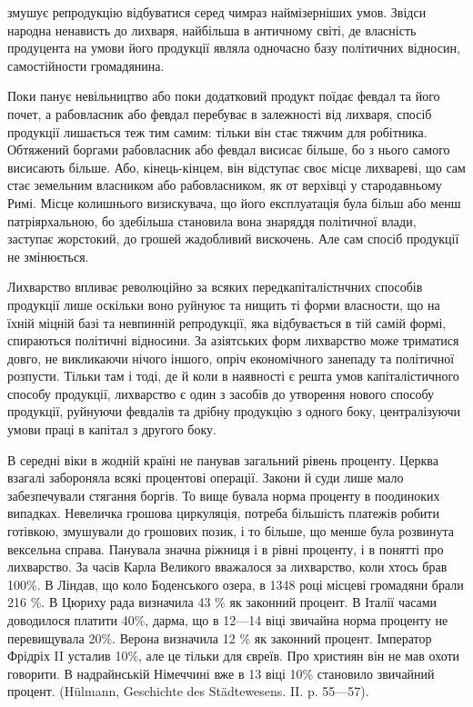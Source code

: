 \parcont{}  %
змушує репродукцію відбуватися серед чимраз наймізерніших умов. Звідси народна
ненависть до лихваря, найбільша в античному світі, де власність продуцента на
умови його продукції являла одночасно базу політичних відносин, самостійности
громадянина.

Поки панує невільництво або поки додатковий продукт поїдає февдал та
його почет, а рабовласник або февдал перебуває в залежності від лихваря,
спосіб продукції лишається теж тим самим: тільки він стає тяжчим для робітника.
Обтяжений боргами рабовласник або февдал висисає більше, бо з нього
самого висисають більше. Або, кінець-кінцем, він відступає своє місце лихвареві,
що сам стає земельним власником або рабовласником, як от верхівці
у стародавньому Римі. Місце колишнього визискувача, що його експлуатація
була більш або менш патріярхальною, бо здебільша становила вона знаряддя
політичної влади, заступає жорстокий, до грошей жадобливий вискочень. Але сам
спосіб продукції не змінюється.

Лихварство впливає революційно за всяких передкапіталістнчних способів
продукції лише оскільки воно руйнуює та нищить ті форми власности, що
на їхній міцній базі та невпинній репродукції, яка відбувається в тій самій
формі, спираються політичні відносини. За азіятських форм лихварство може
триматися довго, не викликаючи нічого іншого, опріч економічного занепаду та
політичної розпусти. Тільки там і тоді, де й коли в наявності є решта умов капіталістичного
способу продукції, лихварство є один з засобів до утворення
нового способу продукції, руйнуючи февдалів та дрібну продукцію з одного боку,
централізуючи умови праці в капітал з другого боку.

В середні віки в жодній країні не панував загальний рівень проценту.
Церква взагалі забороняла всякі процентові операції. Закони й суди лише мало
забезпечували стягання боргів. То вище бувала норма проценту в поодиноких
випадках. Невеличка грошова циркуляція, потреба більшість платежів робити
готівкою, змушували до грошових позик, і то більше, що менше була розвинута
вексельна справа. Панувала значна ріжниця і в рівні проценту, і в понятті про
лихварство. За часів Карла Великого вважалося за лихварство, коли хтось брав
100\%. В Ліндав, що коло Боденського озера, в 1348 році місцеві громадяни брали
216 \%. В Цюриху рада визначила 43 \% як законний процент. В Італії часами
доводилося платити 40\%, дарма, що в 12—14 віці звичайна норма проценту
не перевищувала 20\%. Верона визначила 12 \% як законний процент. Імператор
Фрідріх II усталив 10\%, але це тільки для євреїв. Про християн він
не мав охоти говорити. В надрайнській Німеччині вже в 13 віці 10\% становило
звичайний процент. (Hülmann, Geschichte des Städtewesens. II. p. 55—57).

